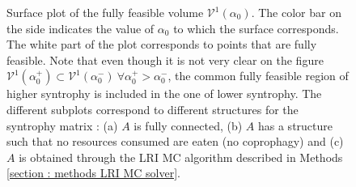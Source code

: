 \documentclass[12pt, titlepage]{report}
\begin{document}
\begin{figure}[h!]
\hspace{-0.1\linewidth}
\captionsetup[subfigure]{captionskip = -185pt, margin = 195pt}
\begin{center}
\end{center}
\caption[caption for LOF]{Surface plot of the fully feasible volume $\mathcal{V}^1(\alpha_0)$. The color bar on the side indicates the value of $\alpha_0$ to which the surface corresponds. The white part of the plot corresponds to points that  are fully feasible. Note that even though it is not very clear on the figure $\mathcal{V}^1(\alpha_0^+) \subset \mathcal{V}^1(\alpha_0^-) \ \forall \alpha_0^+ > \alpha_0^-$, \ie the common fully feasible region of higher syntrophy is included in the one of lower syntrophy. The different subplots correspond to different structures for the syntrophy matrix : (a) $A$ is fully connected, (b) $A$ has a structure such that no resources consumed are eaten (no coprophagy) and (c) $A$ is obtained through the LRI MC algorithm described in Methods \ref{section : methods LRI MC solver}.} \label{fig : results feasibility cfv variation with syntrophy}
\end{figure}
\end{document}
